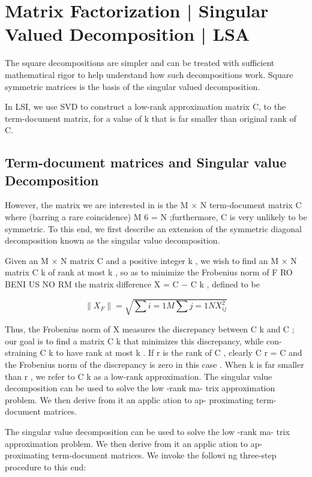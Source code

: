 \section{Matrix Factorization | Singular Valued Decomposition | LSA }
The square decompositions are simpler and can be treated with sufficient mathematical rigor to help understand how such decompositions work. Square symmetric matrices is the basis of the singular valued decomposition.

In LSI, we use SVD to construct a low-rank approximation matrix C, to the term-document matrix, for a value of k that is far smaller than original rank of C. 

\subsection{Term-document matrices and Singular value Decomposition}
However, the matrix we are interested in is the M × N term-document matrix C where (barring a rare coincidence) M 6 = N ;furthermore, C is very unlikely to be symmetric. To this end, we first describe an extension of the symmetric diagonal decomposition known as the singular value decomposition.

Given an M × N matrix C and  a positive  integer k ,  we  wish  to  find  an M × N matrix C k of rank at most k , so as to minimize the Frobenius norm of F RO BENI US NO RM the matrix difference X = C − C k , defined to be

\[
    \| X_{F} \| = \sqrt{\sum{i=1}{M} \sum{j=1}{N} X_{ij}^2}
\]

Thus, the Frobenius norm of X measures the discrepancy between C k and C ; our goal is to find a matrix C k that minimizes this discrepancy, while con- straining C k to have rank at most k .   If r is the  rank of C ,  clearly C r = C and the Frobenius norm of the discrepancy is zero in this case . When k is far smaller than r , we refer to C k as a low-rank approximation. The singular value decomposition can be used to solve the low -rank ma- trix approximation problem.   We then derive from it an applic ation to ap- proximating term-document matrices.

The singular value decomposition can be used to solve the low -rank ma- trix approximation problem.   We then derive from it an applic ation to ap- proximating term-document matrices.   We invoke the followi ng three-step procedure to this end:

